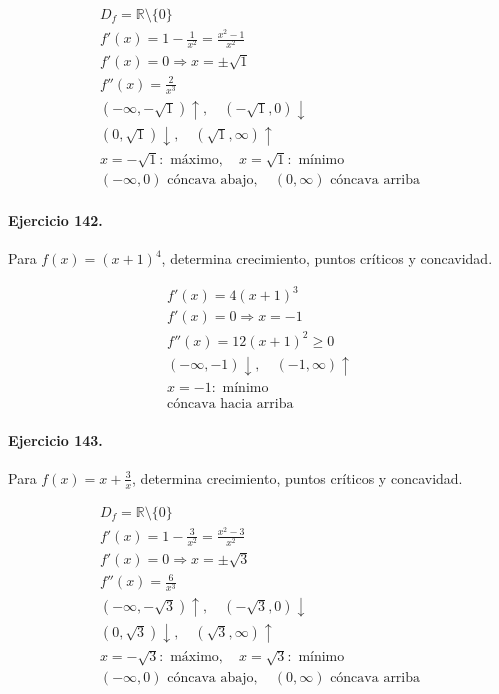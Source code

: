 \documentclass[11pt,a4paper]{article}
\begin{document}
\[
\begin{aligned}
D_f=\mathbb{R}\setminus\{0\}\\
f'(x)=1-\frac{1}{x^2}=\frac{x^2-1}{x^2}\\
f'(x)=0\Rightarrow x=\pm \sqrt{1}\\
f''(x)=\frac{2}{x^3}\\
(-\infty,-\sqrt{1})\uparrow,\quad(-\sqrt{1},0)\downarrow\\
(0,\sqrt{1})\downarrow,\quad(\sqrt{1},\infty)\uparrow\\
x=-\sqrt{1}:\text{ máximo},\quad x=\sqrt{1}:\text{ mínimo}\\
(-\infty,0)\text{{ cóncava abajo}},\quad(0,\infty)\text{{ cóncava arriba}}
\end{aligned}
\]


\paragraph{Ejercicio 142.} Para $f(x)=(x+1)^4$, determina crecimiento, puntos críticos y concavidad.

\[
\begin{aligned}
f'(x)=4(x+1)^3\\
f'(x)=0\Rightarrow x=-1\\
f''(x)=12(x+1)^2\ge0\\
(-\infty,-1)\downarrow,\quad(-1,\infty)\uparrow\\
x=-1:\text{ mínimo}\\
\text{{cóncava hacia arriba}}
\end{aligned}
\]


\paragraph{Ejercicio 143.} Para $f(x)=x+\frac{3}{x}$, determina crecimiento, puntos críticos y concavidad.

\[
\begin{aligned}
D_f=\mathbb{R}\setminus\{0\}\\
f'(x)=1-\frac{3}{x^2}=\frac{x^2-3}{x^2}\\
f'(x)=0\Rightarrow x=\pm \sqrt{3}\\
f''(x)=\frac{6}{x^3}\\
(-\infty,-\sqrt{3})\uparrow,\quad(-\sqrt{3},0)\downarrow\\
(0,\sqrt{3})\downarrow,\quad(\sqrt{3},\infty)\uparrow\\
x=-\sqrt{3}:\text{ máximo},\quad x=\sqrt{3}:\text{ mínimo}\\
(-\infty,0)\text{{ cóncava abajo}},\quad(0,\infty)\text{{ cóncava arriba}}
\end{aligned}
\]
\end{document}
